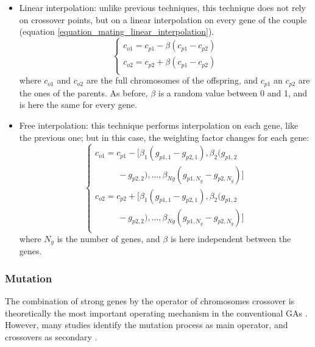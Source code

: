 \documentclass[twocol]{ametsoc}
\begin{document}
\begin{itemize}
	\item Linear interpolation: unlike previous techniques, this technique does not rely on crossover points, but on a linear interpolation on every gene of the couple (equation \ref{equation_mating_linear_interpolation}).
	\begin{equation}
	\left\lbrace \begin{array}{l} 
	c_{o1} = c_{p1} - \beta (c_{p1} - c_{p2}) \\
	c_{o2} = c_{p2} + \beta (c_{p1} - c_{p2}) \\
	\end{array} \right.
	\label{equation_mating_linear_interpolation}
	\end{equation}
	where $c_{o1}$ and $c_{o2}$ are the full chromosomes of the offspring, and $c_{p1}$ an $c_{p2}$ are the ones of the parents. As before, $\beta$ is a random value between 0 and 1, and is here the same for every gene.
	
	\item Free interpolation: this technique performs interpolation on each gene, like the previous one; but in this case, the weighting factor changes for each gene:
	\begin{equation}
	\left\lbrace \begin{array}{l} 
	c_{o1} = c_{p1} - [\beta_{1} (g_{p1,1} - g_{p2,1}), \beta_{2} (g_{p1,2}\\
	~~~~~~~~~~~~ - g_{p2,2}), ..., \beta_{Ng} (g_{p1,N_{g}} - g_{p2,N_{g}})] \\
	c_{o2} = c_{p2} + [\beta_{1} (g_{p1,1} - g_{p2,1}), \beta_{2} (g_{p1,2}\\
	~~~~~~~~~~~~ - g_{p2,2}), ..., \beta_{Ng} (g_{p1,N_{g}} - g_{p2,N_{g}})] \\
	\end{array} \right.
	\label{equation_mating_free_interpolation}
	\end{equation}
	where $N_{g}$ is the number of genes, and $\beta$ is here independent between the genes.
	
\end{itemize}


\subsubsection{Mutation}
\label{sec:gas:mutation}

The combination of strong genes by the operator of chromosomes crossover is theoretically the most important operating mechanism in the conventional GAs \citep{Holland1992b,Back1993b}. However, many studies identify the mutation process as main operator, and crossovers as secondary \citep[see][]{Back1992a, Back1996a, Back1996b, Smith1997a, Deb1999, Costa2005a, Costa2007a}.
\end{document}

